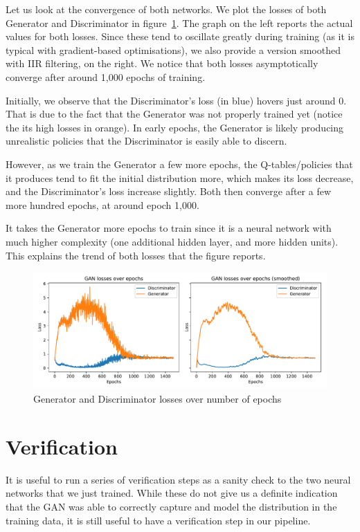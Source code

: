 Let us look at the convergence of both networks. We plot the losses of both Generator and Discriminator in figure~\ref{fig:GANLosses}. The graph on the left reports the actual values for both losses. Since these tend to oscillate greatly during training (as it is typical with gradient-based optimisations), we also provide a version smoothed with IIR filtering, on the right. We notice that both losses asymptotically converge after around 1,000 epochs of training.

Initially, we observe that the Discriminator's loss (in blue) hovers just around 0. That is due to the fact that the Generator was not properly trained yet (notice the its high losses in orange). In early epochs, the Generator is likely producing unrealistic policies that the Discriminator is easily able to discern.

However, as we train the Generator a few more epochs, the Q-tables/policies that it produces tend to fit the initial distribution more, which makes its loss decrease, and the Discriminator's loss increase slightly. Both then converge after a few more hundred epochs, at around epoch 1,000.

It takes the Generator more epochs to train since it is a neural network with much higher complexity (one additional hidden layer, and more hidden units). This explains the trend of both losses that the figure reports.

\begin{figure}
\centering
\includegraphics[width=15cm]{Figures/GAN_losses}
\caption{Generator and Discriminator losses over number of epochs}
\label{fig:GANLosses}
\end{figure}



\section{Verification}
It is useful to run a series of verification steps as a sanity check to the two neural networks that we just trained. While these do not give us a definite indication that the GAN was able to correctly capture and model the distribution in the training data, it is still useful to have a verification step in our pipeline.

